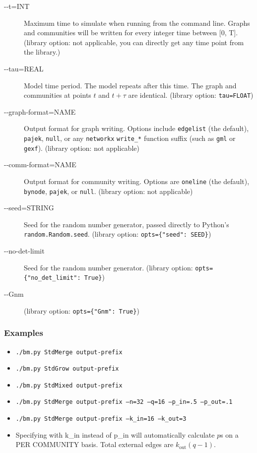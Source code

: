 \documentclass{article}
\def\out{\mathrm{out}}
\def\code#1{\texttt{#1}}
\begin{document}
\begin{description}
\item[-{}-t=INT] Maximum time to simulate when running from the command
  line.  Graphs and communities will be written for every integer time
  between [0, T].  (library option: not applicable, you can directly
  get any time point from the library.)
\item[-{}-tau=REAL] Model time period.  The model repeats after this
  time.  The graph and communities at points $t$ and $t+\tau$ are
  identical.  (library option: \code{tau=FLOAT})
\item [-{}-graph-format=NAME] Output format for graph writing.  Options
  include \texttt{edgelist} (the default), \texttt{pajek},
  \texttt{null}, or any \texttt{networkx} \texttt{write\_*} function
  suffix (such as \texttt{gml} or \texttt{gexf}).  (library option: not
  applicable)
\item [-{}-comm-format=NAME] Output format for community writing.  Options
  are \texttt{oneline} (the default), \texttt{bynode}, \texttt{pajek},
  or \texttt{null}.  (library option: not applicable)
\item [-{}-seed=STRING] Seed for the random number generator, passed
  directly to Python's \code{random.Random.seed}.  (library
  option: \texttt{opts=\{"seed": SEED\}})
\item [-{}-no-det-limit] Seed for the random number generator.  (library
  option: \texttt{opts=\{"no\_det\_limit": True\}})
\item [-{}-Gnm] (library
  option: \texttt{opts=\{"Gnm": True\}})
\end{description}



\subsubsection{Examples}

\begin{itemize}
\item \texttt{./bm.py StdMerge output-prefix}
\item \texttt{./bm.py StdGrow output-prefix}
\item \texttt{./bm.py StdMixed output-prefix}
\item \texttt{./bm.py StdMerge output-prefix --n=32 --q=16 --p\_in=.5 --p\_out=.1}
\item \texttt{./bm.py StdMerge output-prefix --k\_in=16 --k\_out=3}
\item Specifying with k\_in instead of p\_in will automatically
  calculate $p$s on a PER COMMUNITY basis.  Total external edges are $k_\out(q-1)$.
\end{itemize}
\end{document}
